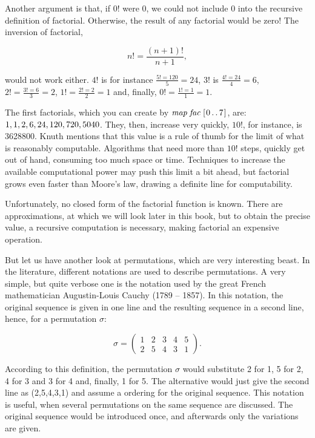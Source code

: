 \documentclass{scrreprt}
\newcommand{\Varid}[1]{\mathit{#1}}
\begin{document}
Another argument is that,
if $0!$ were $0$,
we could not include $0$ into the recursive
definition of factorial.
Otherwise, the result of any factorial would be zero!
The inversion of factorial, \ie\

\begin{equation}
  n! = \frac{(n+1)!}{n+1},
\end{equation}

would not work either.
$4!$ is for instance 
$\frac{5! = 120}{5} = 24$,
$3!$ is $\frac{4!=24}{4} = 6$,
$2! = \frac{3!=6}{3} = 2$,
$1! = \frac{2!=2}{2} = 1$
and, finally, $0! = \frac{1!=1}{1} = 1$.

The first factorials,
which you can create by \ensuremath{\Varid{map}\;\Varid{fac}\;[\mskip1.5mu \mathrm{0}\mathinner{\ldotp\ldotp}\mathrm{7}\mskip1.5mu]}, are:
$1, 1, 2, 6, 24, 120,\\ 720, 5040$.
They, then, increase very quickly,
$10!$, for instance, is \num{3628800}.
Knuth mentions that this value
is a rule of thumb for the limit
of what is reasonably computable.
Algorithms that need more than $10!$ steps,
quickly get out of hand,
consuming too much space or time.
Techniques to increase the available computational power
may push this limit a bit ahead,
but factorial grows even faster than Moore's law,
drawing a definite line for computability.

Unfortunately, no closed form of the factorial function
is known. There are approximations,
at which we will look later in this book,
but to obtain the precise value,
a recursive computation is necessary,
making factorial an expensive operation.

But let us have another look at permutations,
which are very interesting beast.
In the literature, different notations are used
to describe permutations. 
A very simple, but quite verbose one is
the  notation used by the 
great French mathematician Augustin-Louis Cauchy (1789 -- 1857).
In this notation, the original sequence is given in one line
and the resulting sequence in a second line, hence, 
for a permutation $\sigma$:

\[
\sigma = \begin{pmatrix}
         1 & 2 & 3 & 4 & 5 \\
         2 & 5 & 4 & 3 & 1 
         \end{pmatrix}.
\]

According to this definition,
the permutation $\sigma$ would
substitute 2 for 1, 5 for 2, 4 for 3 and 3 for 4 
and, finally, 1 for 5.
The alternative  
would just give the second line as (2,5,4,3,1)
and assume a  ordering for the original sequence.
This notation is useful, when several permutations
on the same sequence are discussed.
The original sequence would be introduced once,
and afterwards only the variations are given.
\end{document}
